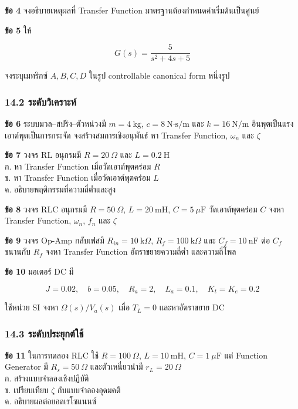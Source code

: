 \textbf{ข้อ 4} จงอธิบายเหตุผลที่ Transfer Function มาตรฐานต้องกำหนดค่าเริ่มต้นเป็นศูนย์

\textbf{ข้อ 5} ให้

\[
G(s)=\frac{5}{s^2+4s+5}
\]

จงระบุเมทริกซ์ $A,B,C,D$ ในรูป controllable canonical form หนึ่งรูป

\subsubsection{14.2 ระดับวิเคราะห์}

\textbf{ข้อ 6} ระบบมวล–สปริง–ตัวหน่วงมี $m=4\ \text{kg}$, $c=8\ \text{N·s/m}$ และ $k=16\ \text{N/m}$ อินพุตเป็นแรง เอาต์พุตเป็นการกระจัด จงสร้างสมการเชิงอนุพันธ์ หา Transfer Function, $\omega_n$ และ $\zeta$

\textbf{ข้อ 7} วงจร RL อนุกรมมี $R=20\ \Omega$ และ $L=0.2\ \text{H}$\\ก. หา Transfer Function เมื่อวัดเอาต์พุตคร่อม $R$\\ข. หา Transfer Function เมื่อวัดเอาต์พุตคร่อม $L$\\ค. อธิบายพฤติกรรมที่ความถี่ต่ำและสูง

\textbf{ข้อ 8} วงจร RLC อนุกรมมี $R=50\ \Omega$, $L=20\ \text{mH}$, $C=5\ \mu\text{F}$ วัดเอาต์พุตคร่อม $C$ จงหา Transfer Function, $\omega_n$, $f_n$ และ $\zeta$

\textbf{ข้อ 9} วงจร Op-Amp กลับเฟสมี $R_{in}=10\ \text{k}\Omega$, $R_f=100\ \text{k}\Omega$ และ $C_f=10\ \text{nF}$ ต่อ $C_f$ ขนานกับ $R_f$ จงหา Transfer Function อัตราขยายความถี่ต่ำ และความถี่โพล

\textbf{ข้อ 10} มอเตอร์ DC มี

\[
J=0.02,\quad b=0.05,\quad
R_a=2,\quad L_a=0.1,\quad
K_t=K_e=0.2
\]

ใช้หน่วย SI จงหา $\Omega(s)/V_a(s)$ เมื่อ $T_L=0$ และหาอัตราขยาย DC

\subsubsection{14.3 ระดับประยุกต์ใช้}

\textbf{ข้อ 11} ในการทดลอง RLC ใช้ $R=100\ \Omega$, $L=10\ \text{mH}$, $C=1\ \mu\text{F}$ แต่ Function Generator มี $R_s=50\ \Omega$ และตัวเหนี่ยวนำมี $r_L=20\ \Omega$\\ก. สร้างแบบจำลองเชิงปฏิบัติ\\ข. เปรียบเทียบ $\zeta$ กับแบบจำลองอุดมคติ\\ค. อธิบายผลต่อยอดเรโซแนนซ์


